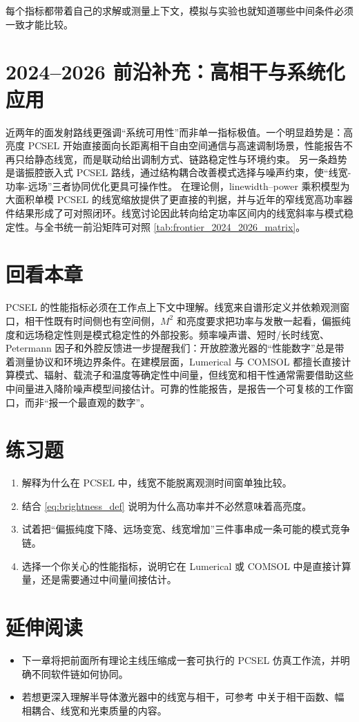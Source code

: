每个指标都带着自己的求解或测量上下文，模拟与实验也就知道哪些中间条件必须一致才能比较。

\section{2024--2026 前沿补充：高相干与系统化应用}
近两年的面发射路线更强调“系统可用性”而非单一指标极值。一个明显趋势是：高亮度 PCSEL 开始直接面向长距离相干自由空间通信与高速调制场景，性能报告不再只给静态线宽，而是联动给出调制方式、链路稳定性与环境约束\cite{inoue2025fmpcsel,yoshida2023}。  
另一条趋势是谐振腔嵌入式 PCSEL 路线，通过结构耦合改善模式选择与噪声约束，使“线宽-功率-远场”三者协同优化更具可操作性\cite{bian2024resonatorpcsel}。  
在理论侧，linewidth--power 乘积模型为大面积单模 PCSEL 的线宽缩放提供了更直接的判据，并与近年的窄线宽高功率器件结果形成了可对照闭环\cite{wenzel2025linewidthpowerproduct,aoki2025narrowlinewidthpcsel}。线宽讨论因此转向给定功率区间内的线宽斜率与模式稳定性。与全书统一前沿矩阵可对照 \cref{tab:frontier_2024_2026_matrix}。

\section*{回看本章}
PCSEL 的性能指标必须在工作点上下文中理解。线宽来自谱形定义并依赖观测窗口，相干性既有时间侧也有空间侧，$M^2$ 和亮度要求把功率与发散一起看，偏振纯度和远场稳定性则是模式稳定性的外部投影。频率噪声谱、短时/长时线宽、Petermann 因子和外腔反馈进一步提醒我们：开放腔激光器的“性能数字”总是带着测量协议和环境边界条件。在建模层面，Lumerical 与 COMSOL 都擅长直接计算模式、辐射、载流子和温度等确定性中间量，但线宽和相干性通常需要借助这些中间量进入降阶噪声模型间接估计。可靠的性能报告，是报告一个可复核的工作窗口，而非“报一个最直观的数字”。

\section*{练习题}
\begin{enumerate}
  \item \basicq 解释为什么在 PCSEL 中，线宽不能脱离观测时间窗单独比较。

  \item \basicq 结合 \cref{eq:brightness_def} 说明为什么高功率并不必然意味着高亮度。

  \item \midq 试着把“偏振纯度下降、远场变宽、线宽增加”三件事串成一条可能的模式竞争链。

  \item \hardq 选择一个你关心的性能指标，说明它在 Lumerical 或 COMSOL 中是直接计算量，还是需要通过中间量间接估计。
\end{enumerate}

\section*{延伸阅读}
\begin{itemize}
  \item 下一章将把前面所有理论主线压缩成一套可执行的 PCSEL 仿真工作流，并明确不同软件链如何协同。

  \item 若想更深入理解半导体激光器中的线宽与相干，可参考 \cite{siegman1986,coldren2012,henry1982} 中关于相干函数、幅相耦合、线宽和光束质量的内容。
\end{itemize}
